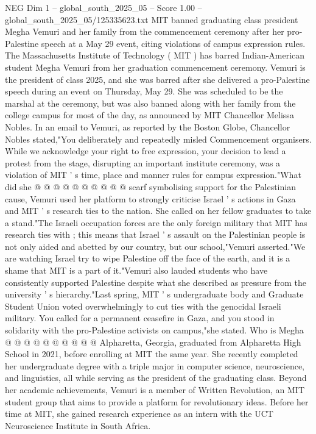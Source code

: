 \begin{textsample}{NEG Dim 1 – global\_south\_2025\_05 – Score 1.00 – global\_south\_2025\_05/125335623.txt}  \label{ex:f1_neg_379}
MIT banned graduating class president Megha Vemuri and her family from the commencement ceremony after her pro-Palestine speech at a May 29 event, citing violations of campus expression rules.
The Massachusetts Institute of Technology ( MIT ) has barred Indian-American student Megha Vemuri from her graduation commencement ceremony.
Vemuri is the president of class 2025, and she was barred after she delivered a pro-Palestine speech during an event on Thursday, May 29.
She was scheduled to be the marshal at the ceremony, but was also banned along with her family from the college campus for most of the day, as announced by MIT Chancellor Melissa Nobles.
In an email to Vemuri, as reported by the Boston Globe, Chancellor Nobles stated,"You deliberately and repeatedly misled Commencement organisers.
While we acknowledge your right to free expression, your decision to lead a protest from the stage, disrupting an important institute ceremony, was a violation of MIT ' s time, place and manner rules for campus expression."What did she @ @ @ @ @ @ @ @ @ @ scarf symbolising support for the Palestinian cause, Vemuri used her platform to strongly criticise Israel ' s actions in Gaza and MIT ' s research ties to the nation.
She called on her fellow graduates to take a stand."The Israeli occupation forces are the only foreign military that MIT has research ties with ; this means that Israel ' s assault on the Palestinian people is not only aided and abetted by our country, but our school,"Vemuri asserted."We are watching Israel try to wipe Palestine off the face of the earth, and it is a shame that MIT is a part of it."Vemuri also lauded students who have consistently supported Palestine despite what she described as pressure from the university ' s hierarchy."Last spring, MIT ' s undergraduate body and Graduate Student Union voted overwhelmingly to cut ties with the genocidal Israeli military.
You called for a permanent ceasefire in Gaza, and you stood in solidarity with the pro-Palestine activists on campus,"she stated.
Who is Megha @ @ @ @ @ @ @ @ @ @ Alpharetta, Georgia, graduated from Alpharetta High School in 2021, before enrolling at MIT the same year.
She recently completed her undergraduate degree with a triple major in computer science, neuroscience, and linguistics, all while serving as the president of the graduating class.
Beyond her academic achievements, Vemuri is a member of Written Revolution, an MIT student group that aims to provide a platform for revolutionary ideas.
Before her time at MIT, she gained research experience as an intern with the UCT Neuroscience Institute in South Africa.

\end{textsample}
